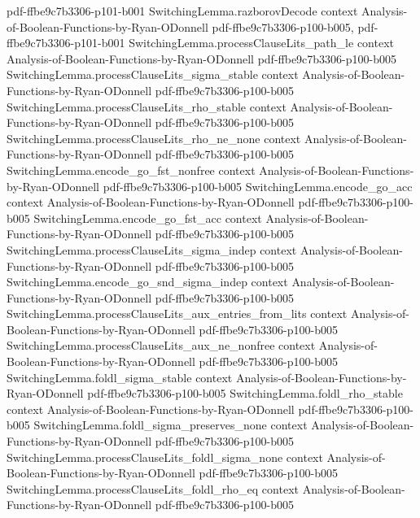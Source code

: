 \begin{theorem}
{    pdf-ffbe9c7b3306-p101-b001}
\proofstep
  {SwitchingLemma.razborovDecode}
  {context}
  {Analysis-of-Boolean-Functions-by-Ryan-ODonnell}
  {pdf-ffbe9c7b3306-p100-b005,
    pdf-ffbe9c7b3306-p101-b001}
\proofstep
  {SwitchingLemma.processClauseLits_path_le}
  {context}
  {Analysis-of-Boolean-Functions-by-Ryan-ODonnell}
  {pdf-ffbe9c7b3306-p100-b005}
\proofstep
  {SwitchingLemma.processClauseLits_sigma_stable}
  {context}
  {Analysis-of-Boolean-Functions-by-Ryan-ODonnell}
  {pdf-ffbe9c7b3306-p100-b005}
\proofstep
  {SwitchingLemma.processClauseLits_rho_stable}
  {context}
  {Analysis-of-Boolean-Functions-by-Ryan-ODonnell}
  {pdf-ffbe9c7b3306-p100-b005}
\proofstep
  {SwitchingLemma.processClauseLits_rho_ne_none}
  {context}
  {Analysis-of-Boolean-Functions-by-Ryan-ODonnell}
  {pdf-ffbe9c7b3306-p100-b005}
\proofstep
  {SwitchingLemma.encode_go_fst_nonfree}
  {context}
  {Analysis-of-Boolean-Functions-by-Ryan-ODonnell}
  {pdf-ffbe9c7b3306-p100-b005}
\proofstep
  {SwitchingLemma.encode_go_acc}
  {context}
  {Analysis-of-Boolean-Functions-by-Ryan-ODonnell}
  {pdf-ffbe9c7b3306-p100-b005}
\proofstep
  {SwitchingLemma.encode_go_fst_acc}
  {context}
  {Analysis-of-Boolean-Functions-by-Ryan-ODonnell}
  {pdf-ffbe9c7b3306-p100-b005}
\proofstep
  {SwitchingLemma.processClauseLits_sigma_indep}
  {context}
  {Analysis-of-Boolean-Functions-by-Ryan-ODonnell}
  {pdf-ffbe9c7b3306-p100-b005}
\proofstep
  {SwitchingLemma.encode_go_snd_sigma_indep}
  {context}
  {Analysis-of-Boolean-Functions-by-Ryan-ODonnell}
  {pdf-ffbe9c7b3306-p100-b005}
\proofstep
  {SwitchingLemma.processClauseLits_aux_entries_from_lits}
  {context}
  {Analysis-of-Boolean-Functions-by-Ryan-ODonnell}
  {pdf-ffbe9c7b3306-p100-b005}
\proofstep
  {SwitchingLemma.processClauseLits_aux_ne_nonfree}
  {context}
  {Analysis-of-Boolean-Functions-by-Ryan-ODonnell}
  {pdf-ffbe9c7b3306-p100-b005}
\proofstep
  {SwitchingLemma.foldl_sigma_stable}
  {context}
  {Analysis-of-Boolean-Functions-by-Ryan-ODonnell}
  {pdf-ffbe9c7b3306-p100-b005}
\proofstep
  {SwitchingLemma.foldl_rho_stable}
  {context}
  {Analysis-of-Boolean-Functions-by-Ryan-ODonnell}
  {pdf-ffbe9c7b3306-p100-b005}
\proofstep
  {SwitchingLemma.foldl_sigma_preserves_none}
  {context}
  {Analysis-of-Boolean-Functions-by-Ryan-ODonnell}
  {pdf-ffbe9c7b3306-p100-b005}
\proofstep
  {SwitchingLemma.processClauseLits_foldl_sigma_none}
  {context}
  {Analysis-of-Boolean-Functions-by-Ryan-ODonnell}
  {pdf-ffbe9c7b3306-p100-b005}
\proofstep
  {SwitchingLemma.processClauseLits_foldl_rho_eq}
  {context}
  {Analysis-of-Boolean-Functions-by-Ryan-ODonnell}
  {pdf-ffbe9c7b3306-p100-b005}

\end{theorem}
